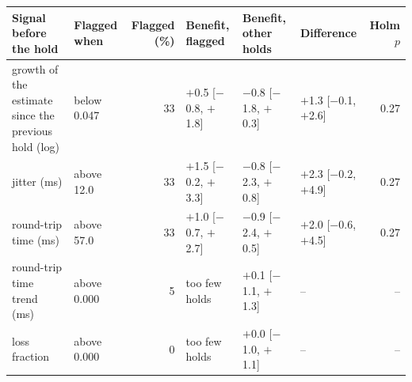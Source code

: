 \begin{tabular}{llrlllr}
\toprule
Signal before the hold & Flagged when & Flagged (\%) & Benefit, flagged & Benefit, other holds & Difference & Holm $p$ \\
\midrule
growth of the estimate since the previous hold (log) & below 0.047 & 33 & $+$0.5 [$-$0.8, $+$1.8] & $-$0.8 [$-$1.8, $+$0.3] & $+$1.3 [$-$0.1, $+$2.6] & 0.27 \\
jitter (ms) & above 12.0 & 33 & $+$1.5 [$-$0.2, $+$3.3] & $-$0.8 [$-$2.3, $+$0.8] & $+$2.3 [$-$0.2, $+$4.9] & 0.27 \\
round-trip time (ms) & above 57.0 & 33 & $+$1.0 [$-$0.7, $+$2.7] & $-$0.9 [$-$2.4, $+$0.5] & $+$2.0 [$-$0.6, $+$4.5] & 0.27 \\
round-trip time trend (ms) & above 0.000 & 5 & too few holds & $+$0.1 [$-$1.1, $+$1.3] & -- & -- \\
loss fraction & above 0.000 & 0 & too few holds & $+$0.0 [$-$1.0, $+$1.1] & -- & -- \\
\bottomrule
\end{tabular}
